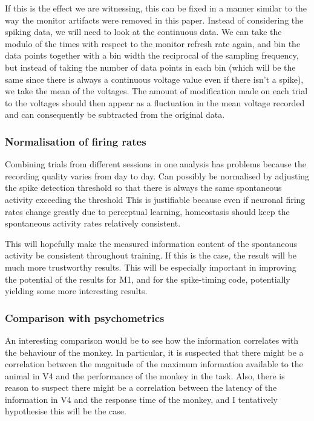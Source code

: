 If this is the effect we are witnessing, this can be fixed in a manner similar to the way the monitor artifacts were removed in this paper.
Instead of considering the spiking data, we will need to look at the continuous data.
We can take the modulo of the times with respect to the monitor refresh rate again, and bin the data points together with a bin width the reciprocal of the sampling frequency, but instead of taking the number of data points in each bin (which will be the same since there is always a continuous voltage value even if there isn't a spike), we take the mean of the voltages.
The amount of modification made on each trial to the voltages should then appear as a fluctuation in the mean voltage recorded and can consequently be subtracted from the original data.

\subsubsection{Normalisation of firing rates}

Combining trials from different sessions in one analysis has problems because the recording quality varies from day to day.
Can possibly be normalised by adjusting the spike detection threshold so that there is always the same spontaneous activity exceeding the threshold
This is justifiable because even if neuronal firing rates change greatly due to perceptual learning, homeostasis should keep the spontaneous activity rates relatively consistent.

This will hopefully make the measured information content of the spontaneous activity be consistent throughout training.
If this is the case, the result will be much more trustworthy results.
This will be especially important in improving the potential of the results for \ac{M1}, and for the spike-timing code, potentially yielding some more interesting results.

\subsubsection{Comparison with psychometrics}

An interesting comparison would be to see how the information correlates with the behaviour of the monkey.
In particular, it is suspected that there might be a correlation between the magnitude of the maximum information available to the animal in \ac{V4} and the performance of the monkey in the task.
Also, there is reason to suspect there might be a correlation between the latency of the information in \ac{V4} and the response time of the monkey, and I tentatively hypothesise this will be the case.

